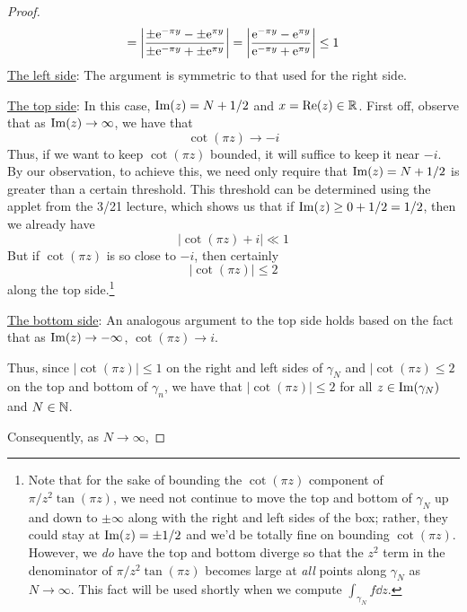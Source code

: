 \documentclass[../psets.tex]{subfiles}
\begin{document}
\begin{enumerate}[ref={A.\arabic*}]
\begin{proof}
\begin{equation*}
            = \left| \frac{\pm\e[-\pi y]-\pm\e[\pi y]}{\pm\e[-\pi y]+\pm\e[\pi y]} \right|
            = \left| \frac{\e[-\pi y]-\e[\pi y]}{\e[-\pi y]+\e[\pi y]} \right|
            \leq 1
        \end{equation*}
        \underline{The left side}: The argument is symmetric to that used for the right side.\par
        \underline{The top side}: In this case, $\im(z)=N+1/2$ and $x=\re(z)\in\R$. First off, observe that as $\im(z)\to\infty$, we have that
        \begin{equation*}
            \cot(\pi z) \to -i
        \end{equation*}
        Thus, if we want to keep $\cot(\pi z)$ bounded, it will suffice to keep it near $-i$. By our observation, to achieve this, we need only require that $\im(z)=N+1/2$ is greater than a certain threshold. This threshold can be determined using the applet from the 3/21 lecture, which shows us that if $\im(z)\geq 0+1/2=1/2$, then we already have
        \begin{equation*}
            |\cot(\pi z)+i| \ll 1
        \end{equation*}
        But if $\cot(\pi z)$ is so close to $-i$, then certainly
        \begin{equation*}
            |\cot(\pi z)| \leq 2
        \end{equation*}
        along the top side.\footnote{Note that for the sake of bounding the $\cot(\pi z)$ component of $\pi/z^2\tan(\pi z)$, we need not continue to move the top and bottom of $\gamma_N$ up and down to $\pm\infty$ along with the right and left sides of the box; rather, they could stay at $\im(z)=\pm 1/2$ and we'd be totally fine on bounding $\cot(\pi z)$. However, we \emph{do} have the top and bottom diverge so that the $z^2$ term in the denominator of $\pi/z^2\tan(\pi z)$ becomes large at \emph{all} points along $\gamma_N$ as $N\to\infty$. This fact will be used shortly when we compute $\int_{\gamma_N}f\dd{z}$.}\par
        \underline{The bottom side}: An analogous argument to the top side holds based on the fact that as $\im(z)\to -\infty$, $\cot(\pi z)\to i$.\par
        Thus, since $|\cot(\pi z)|\leq 1$ on the right and left sides of $\gamma_N$ and $|\cot(\pi z)\leq 2$ on the top and bottom of $\gamma_n$, we have that $|\cot(\pi z)|\leq 2$ for all $z\in\im(\gamma_N)$ and $N\in\N$.\par
        Consequently, as $N\to\infty$,

\end{proof}
\end{enumerate}
\end{document}
